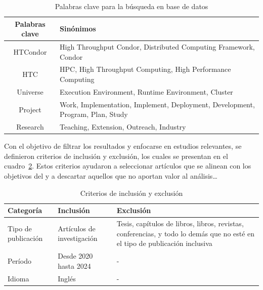 \begin{table}[H]
	\centering
	\scriptsize
	\setlength{\tabcolsep}{4pt}
	\begin{tabular}{|c|p{11.5cm}|} %
		\hline
		\textbf{Palabras clave} & \textbf{Sinónimos}                                                             \\
		\hline
		HTCondor                & High Throughput Condor, Distributed Computing Framework, Condor                \\
		\hline
		HTC                     & HPC, High Throughput Computing, High Performance Computing                     \\
		\hline
		Universe                & Execution Environment, Runtime Environment, Cluster                            \\
		\hline
		Project                 & Work, Implementation, Implement, Deployment, Development, Program, Plan, Study \\
		\hline
		Research                & Teaching, Extension, Outreach, Industry                                        \\
		\hline
	\end{tabular}
	\caption{Palabras clave para la búsqueda en base de datos}
	\label{tab:keywords}
\end{table}



\noindent
Con el objetivo de filtrar los resultados y enfocarse en estudios relevantes, se definieron criterios de inclusión y exclusión, los cuales se presentan en el cuadro~\ref{table:criterios-inclusion-exclusion}. Estos criterios ayudaron a seleccionar artículos que se alinean con los objetivos del \SMS y a descartar aquellos que no aportan valor al análisis\dots

\begin{table}[H]
	\centering
	\caption{Criterios de inclusión y exclusión}
	\begin{tabular}{|p{3cm}|p{5cm}|p{6cm}|}
		\hline
		\textbf{Categoría}  & \textbf{Inclusión}         & \textbf{Exclusión}                                                                                                          \\
		\hline
		Tipo de publicación & Artículos de investigación & Tesis, capítulos de libros, libros, revistas, conferencias, y todo lo demás que no esté en el tipo de publicación inclusiva \\
		\hline
		Período             & Desde 2020 hasta 2024      & -                                                                                                                           \\
		\hline
		Idioma              & Inglés                     & -                                                                                                                           \\
		\hline
	\end{tabular}
	\label{table:criterios-inclusion-exclusion}
\end{table}



